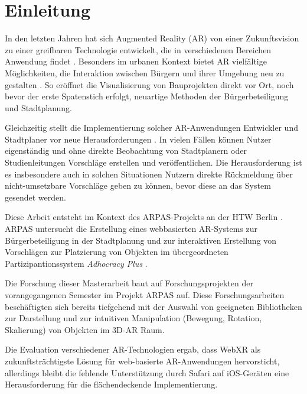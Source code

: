 \section{Einleitung}\label{section:Einleitung}

In den letzten Jahren hat sich Augmented Reality (AR) von einer Zukunftsvision zu einer greifbaren Technologie entwickelt, die in verschiedenen Bereichen Anwendung findet \parencite{nitikaStudyAugmentedReality2021}. Besonders im urbanen Kontext bietet AR vielfältige Möglichkeiten, die Interaktion zwischen Bürgern und ihrer Umgebung neu zu gestalten \parencite{rzeszewskiUsabilityWebXRVisualizations2021}. So eröffnet die Visualisierung von Bauprojekten direkt vor Ort, noch bevor der erste Spatenstich erfolgt, neuartige Methoden der Bürgerbeteiligung und Stadtplanung.

Gleichzeitig stellt die Implementierung solcher AR-Anwendungen Entwickler und Stadtplaner vor neue Herausforderungen \parencite{zubairHowLongYou2021}. In vielen Fällen können Nutzer eigenständig und ohne direkte Beobachtung von Stadtplanern oder Studienleitungen Vorschläge erstellen und veröffentlichen. Die Herausforderung ist es insbesondere auch in solchen Situationen Nutzern direkte Rückmeldung über nicht-umsetzbare Vorschläge geben zu können, bevor diese an das System gesendet werden.

\medskip

Diese Arbeit entsteht im Kontext des ARPAS-Projekts an der HTW Berlin \parencite{israelARgestutztePartizipationStadtentwicklung2025}. ARPAS untersucht die Erstellung eines webbasierten AR-Systems zur Bürgerbeteiligung in der Stadtplanung und zur interaktiven Erstellung von Vorschlägen zur Platzierung von Objekten im übergeordneten Partizipantionssystem \textit{Adhocracy Plus} \parencite{liquiddemocracye.v.LiqdAdhocracyplus2025}.

\medskip
Die Forschung dieser Masterarbeit baut auf Forschungsprojekten der vorangegangenen Semester im Projekt ARPAS auf. Diese Forschungsarbeiten beschäftigten sich bereits tiefgehend mit der Auswahl von geeigneten Bibliotheken zur Darstellung und zur intuitiven Manipulation (Bewegung, Rotation, Skalierung) von Objekten im 3D-AR Raum.

Die Evaluation verschiedener AR-Technologien ergab, dass WebXR als zukunftsträchtigste Lösung für web-basierte AR-Anwendungen hervorsticht, allerdings bleibt die fehlende Unterstützung durch Safari auf iOS-Geräten eine Herausforderung für die flächendeckende Implementierung.

